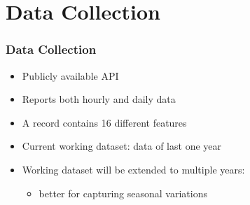 \section{Data Collection}
\begin{frame}
\frametitle{Data Collection}
\begin{itemize}
\setlength\itemsep{1em}
\item Publicly available API
\item Reports both hourly and daily data
\item A record contains 16 different features
\item Current working dataset: data of last one year
\item Working dataset will be extended to multiple years:\\
	\begin{itemize}
	\item better for capturing seasonal variations
	\end{itemize}
\end{itemize}
\end{frame}
